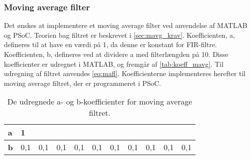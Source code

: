 \subsubsection{Moving average filter}
Det ønskes at implementere et moving average filter ved anvendelse af MATLAB og PSoC. 
Teorien bag filtret er beskrevet i \autoref{sec:mavg_krav}. Koefficienten, a, defineres til at have en værdi på 1, da denne er konstant for FIR-filtre. Koefficienten, b, defineres ved at dividere a med filterlængden på 10. 
Disse koefficienter er udregnet i MATLAB, og fremgår af \autoref{tab:koeff_mavg}. Til udregning af filtret anvendes \autoref{eq:mafl}. Koefficienterne implementeres herefter til moving average filtret, der er programmeret i PSoC. 

\begin{table}[H]
\centering
\begin{tabular}{|l|l|l|l|l|l|l|l|l|l|l|}
\hline
\textbf{a} & 1   &     &     &     &     &     &     &     &     &     \\ \hline
\textbf{b} & 0,1 & 0,1 & 0,1 & 0,1 & 0,1 & 0,1 & 0,1 & 0,1 & 0,1 & 0,1 \\ \hline
\end{tabular}
\caption{De udregnede a- og b-koefficienter for moving average filtret.}
\label{tab:koeff_mavg}
\end{table}
